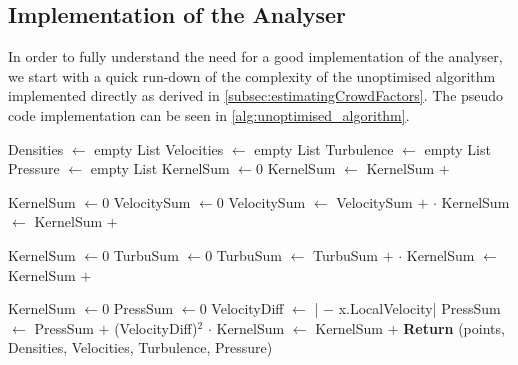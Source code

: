 \subsection{Implementation of the Analyser}\label{s3:analyser_implementation}

In order to fully understand the need for a good implementation of the analyser, we start with a quick run-down of the complexity of the unoptimised algorithm implemented directly as derived in \cref{subsec:estimatingCrowdFactors}. The pseudo code implementation can be seen in \cref{alg:unoptimised_algorithm}.
\begin{center}
\label{alg:unoptimised_algorithm}
\begin{algorithmic}[1]

\State Densities $\gets$ empty List
\State Velocities $\gets$ empty List
\State Turbulence $\gets$ empty List
\State Pressure $\gets$ empty List
    \State KernelSum $\gets 0$
        \State KernelSum $\gets$ KernelSum $+$ 
    \EndFor
    \State {}
\EndFor

    \State KernelSum $\gets 0$
    \State VelocitySum $\gets 0$
        \State VelocitySum $\gets$ VelocitySum $+$  $\cdot$ 
        \State KernelSum $\gets$ KernelSum $+$ 
    \EndFor
    \State {}
\EndFor

    \State KernelSum $\gets 0$
    \State TurbuSum $\gets 0$
        \State TurbuSum $\gets$ TurbuSum $+$  $\cdot$ 
        \State KernelSum $\gets$ KernelSum $+$ 
    \EndFor
    \State {}
\EndFor

    \State KernelSum $\gets 0$
    \State PressSum $\gets 0$
        \State VelocityDiff $\gets$ | $-$ x.LocalVelocity|
        \State PressSum $\gets$ PressSum $+$ (VelocityDiff)$^2$ $\cdot$ 
        \State KernelSum $\gets$ KernelSum $+$ 
    \EndFor
    \State {}
\EndFor
\State\textbf{Return} (points, Densities, Velocities, Turbulence, Pressure)
\EndFunction
\end{algorithmic}
\end{center}

